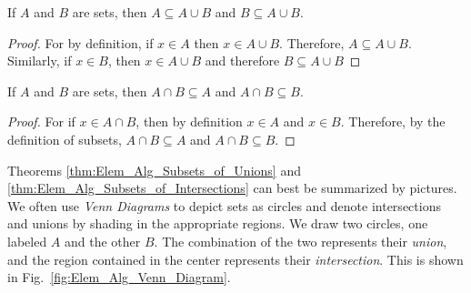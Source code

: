 \documentclass[crop=false,class=book,oneside]{standalone}
\begin{document}
            \begin{theorem}
                \label{thm:Elem_Alg_Subsets_of_Unions}
                If $A$ and $B$ are sets, then
                $A\subseteq{A}\cup{B}$ and
                $B\subseteq{A}\cup{B}$.
            \end{theorem}
            \begin{proof}
                For by definition, if $x\in{A}$ then
                $x\in{A}\cup{B}$. Therefore,
                $A\subseteq{A}\cup{B}$.
                Similarly, if $x\in{B}$, then
                $x\in{A}\cup{B}$ and therefore
                $B\subseteq{A}\cup{B}$
            \end{proof}
            \begin{theorem}
                \label{thm:Elem_Alg_Subsets_of_Intersections}
                If $A$ and $B$ are sets, then
                $A\cap{B}\subseteq{A}$ and
                $A\cap{B}\subseteq{B}$.
            \end{theorem}
            \begin{proof}
                For if $x\in{A}\cap{B}$, then by definition
                $x\in{A}$ and $x\in{B}$.
                Therefore, by the definition of subsets,
                ${A}\cap{B}\subseteq{A}$ and
                ${A}\cap{B}\subseteq{B}$.
            \end{proof}
            Theorems \ref{thm:Elem_Alg_Subsets_of_Unions}
            and \ref{thm:Elem_Alg_Subsets_of_Intersections}
            can best be summarized by pictures. We often use
            \textit{Venn Diagrams} to depict sets as circles
            and denote intersections and unions by shading
            in the appropriate regions. We draw two circles,
            one labeled $A$ and the other $B$. The combination
            of the two represents their \textit{union},
            and the region contained in the center
            represents their \textit{intersection}.
            This is shown in Fig.~\ref{fig:Elem_Alg_Venn_Diagram}.
\end{document}
